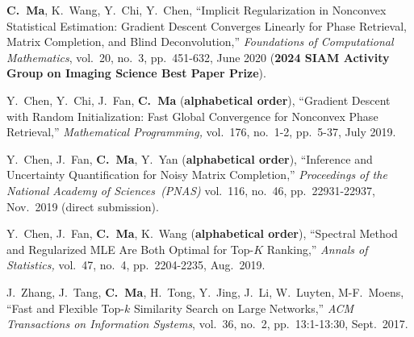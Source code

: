 \documentclass[a4paper, 10pt]{article}
\newenvironment{changemargin}[2]{%
  \begin{list}{}{%
    \setlength{\topsep}{0pt}%
    \setlength{\leftmargin}{#1}%
    \setlength{\rightmargin}{#2}%
    \setlength{\listparindent}{\parindent}%
    \setlength{\itemindent}{\parindent}%
    \setlength{\parsep}{\parskip}%
  }%
  \item[]}{\end{list}
}
\newenvironment{body} {
	\vspace*{-16pt}
	\begin{changemargin}{-0.3in}{-0.5in}
  }	
	{\end{changemargin}
}
\begin{document}
\begin{body}
\begin{enumerate}[label={[{J}{{\arabic*}}]}]
\item \textbf{C.~Ma}, K.~Wang, Y.~Chi, Y.~Chen, {{``Implicit Regularization in Nonconvex Statistical Estimation: Gradient Descent Converges Linearly for Phase Retrieval, Matrix Completion, and Blind Deconvolution,''}}  \emph{Foundations of Computational Mathematics}, vol.~20, no.~3, pp.~451-632, June
2020  (\textbf{2024 SIAM Activity Group on Imaging Science Best Paper Prize}). \\


\item Y.~Chen, Y.~Chi, J.~Fan, \textbf{C.~Ma} (\textbf{alphabetical order}), {``Gradient Descent with Random Initialization: Fast Global Convergence for Nonconvex Phase Retrieval,''} \emph{Mathematical Programming,} vol.~176, no.~1-2, pp.~5-37, July 2019. \\


\item Y.~Chen, J.~Fan, \textbf{C.~Ma}, Y.~Yan (\textbf{alphabetical order}), {``Inference and Uncertainty Quantification for Noisy Matrix Completion,''} \emph{Proceedings of the National Academy of Sciences~(PNAS)} vol.~116, no.~46, pp.~22931-22937, Nov.~2019 (direct submission). \\




	
\item 
	Y.~Chen, J.~Fan, \textbf{C.~Ma}, K.~Wang (\textbf{alphabetical order}), {{``Spectral Method and Regularized MLE Are Both Optimal for Top-$K$ Ranking,''}} \emph{Annals of Statistics,} vol.~47, no.~4, pp.~2204-2235, Aug.~2019. \\







	
	\item J.~Zhang, J.~Tang, \textbf{C.~Ma}, H.~Tong, Y.~Jing, J.~Li, W.~Luyten, M-F.~Moens, {{``Fast and Flexible Top-$k$ Similarity Search on Large Networks,''}} \emph{ACM Transactions on Information Systems}, vol.~36, no.~2,  pp.~13:1-13:30, Sept.~2017.\\
	
\end{enumerate}
\end{body}
\end{document}
